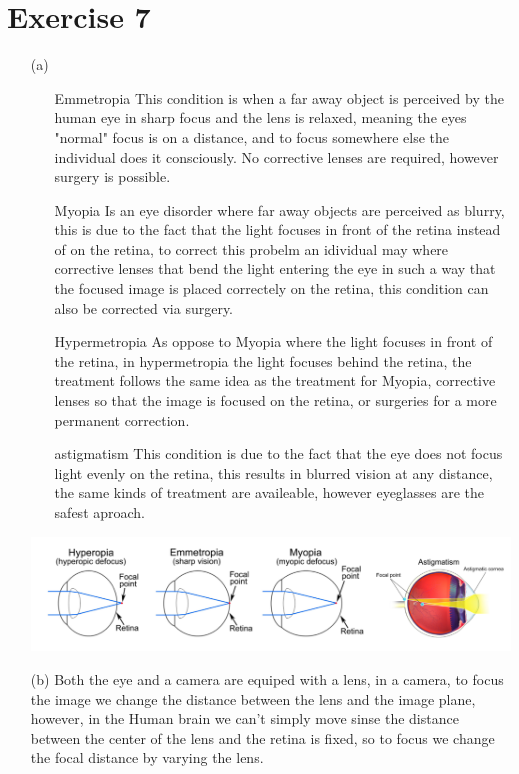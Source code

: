 \documentclass[a4paper]{article}
\begin{document}
\section*{Exercise 7}
\begin{itemize}
\item[(a)]
\begin{itemize}
\item[Emmetropia] This condition is when a far away object is perceived by the human eye in sharp focus and the lens is relaxed, meaning the eyes "normal" focus is on a distance, and to focus somewhere else the individual does it consciously. No corrective lenses are required, however surgery is possible.
\item[Myopia] Is an eye disorder where far away objects are perceived as blurry, this is due to the fact that the light focuses in front of the retina instead of on the retina, to correct this probelm an idividual may where corrective lenses that bend the light entering the eye in such a way that the focused image is placed correctely on the retina, this condition can also be corrected via surgery.
\item[Hypermetropia] As oppose to Myopia where the light focuses in front of the retina, in hypermetropia the light focuses behind the retina, the treatment follows the same idea as the treatment for Myopia, corrective lenses so that the image is focused on the retina, or surgeries for a more permanent correction.
\item[astigmatism] This condition is due to the fact that the eye does not focus light evenly on the retina, this results in blurred vision at any distance, the same kinds of treatment are availeable, however eyeglasses are the safest aproach.
\end{itemize}
\begin{center}
\includegraphics[width=1\textwidth]{images/exercice_7_a.PNG}\\[1cm] 
\end{center}
\item[(b)] Both the eye and a camera are equiped with a lens, in a camera, to focus the image we change the distance between the lens and the image plane, however, in the Human brain we can't simply move sinse the distance between the center of the lens and the retina is fixed, so to focus we change the focal distance by varying the lens.
\end{itemize}

\end{document}
